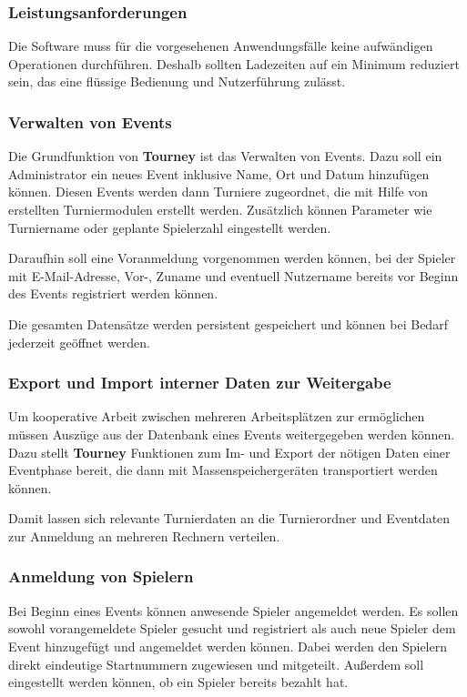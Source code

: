 \documentclass[11pt]{article}
\begin{document}
\subsubsection{Leistungsanforderungen}

Die Software muss für die vorgesehenen Anwendungsfälle keine aufwändigen Operationen durchführen. Deshalb sollten Ladezeiten auf ein Minimum reduziert sein, das eine flüssige Bedienung und Nutzerführung zulässt.

\subsubsection{Verwalten von Events}

Die Grundfunktion von \textbf{Tourney} ist das Verwalten von Events. Dazu soll ein Administrator ein neues Event inklusive Name, Ort und Datum hinzufügen können. Diesen Events werden dann Turniere zugeordnet, die mit Hilfe von erstellten Turniermodulen erstellt werden. Zusätzlich können Parameter wie Turniername oder geplante Spielerzahl eingestellt werden.

Daraufhin soll eine Voranmeldung vorgenommen werden können, bei der Spieler mit E-Mail-Adresse, Vor-, Zuname und eventuell Nutzername bereits vor Beginn des Events registriert werden können.

Die gesamten Datensätze werden persistent gespeichert und können bei Bedarf jederzeit geöffnet werden.

\subsubsection{Export und Import interner Daten zur Weitergabe}

Um kooperative Arbeit zwischen mehreren Arbeitsplätzen zur ermöglichen müssen Auszüge aus der Datenbank eines Events weitergegeben werden können. Dazu stellt \textbf{Tourney} Funktionen zum Im- und Export der nötigen Daten einer Eventphase bereit, die dann mit Massenspeichergeräten transportiert werden können.

Damit lassen sich relevante Turnierdaten an die Turnierordner und Eventdaten zur Anmeldung an mehreren Rechnern verteilen.

\subsubsection{Anmeldung von Spielern}

Bei Beginn eines Events können anwesende Spieler angemeldet werden. Es sollen sowohl vorangemeldete Spieler gesucht und registriert als auch neue Spieler dem Event hinzugefügt und angemeldet werden können. Dabei werden den Spielern direkt eindeutige Startnummern zugewiesen und mitgeteilt. Außerdem soll eingestellt werden können, ob ein Spieler bereits bezahlt hat.
\end{document}
